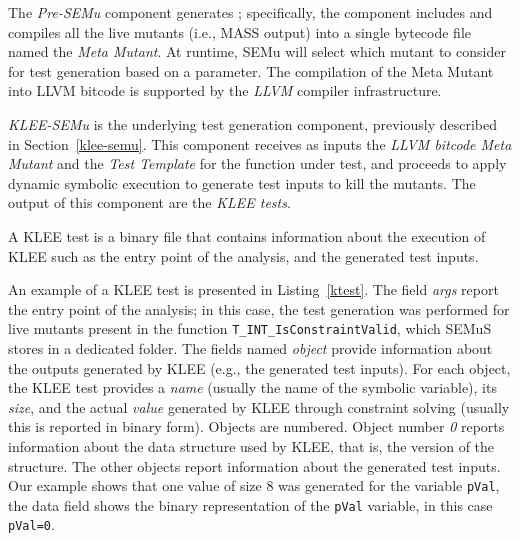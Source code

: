 The \emph{Pre-SEMu} component generates ; specifically, the component includes and compiles all the live mutants (i.e., MASS output) into a single bytecode file named the \emph{Meta Mutant}. At runtime, SEMu will select which mutant to consider for test generation based on a parameter. The compilation of the Meta Mutant into LLVM bitcode is supported by the \emph{LLVM} compiler infrastructure. 



\emph{KLEE-SEMu} is the underlying test generation component, previously described in Section~\ref{klee-semu}. This component receives as inputs the \emph{LLVM bitcode Meta Mutant} and the \emph{Test Template} for the function under test, and proceeds to apply dynamic symbolic execution to generate test inputs to kill the mutants. The output of this component are the \emph{KLEE tests}.

A KLEE test is a binary file that contains information about the execution of KLEE such as the entry point of the analysis, and the generated test inputs.

An example of a KLEE test is presented in Listing~\ref{ktest}. The field \emph{args} report the entry point of the analysis; in this case, the test generation was performed for live mutants present in the function \texttt{T\_INT\_IsConstraintValid}, which SEMuS stores in a dedicated folder. The fields named \emph{object} provide information about the outputs generated by KLEE (e.g., the generated test inputs). 
For each object, the KLEE test provides a \emph{name} (usually the name of the symbolic variable), its \emph{size}, and the actual \emph{value} generated by KLEE through constraint solving (usually this is reported in binary form).
Objects are numbered. Object number \emph{0} reports information about the data structure used by KLEE, that is, the version of the structure. The other objects report information about the generated test inputs.
Our example shows that one value of size 8 was generated for the variable \texttt{pVal}, the data field shows the binary representation of the \texttt{pVal} variable, in this case \texttt{pVal=0}.





